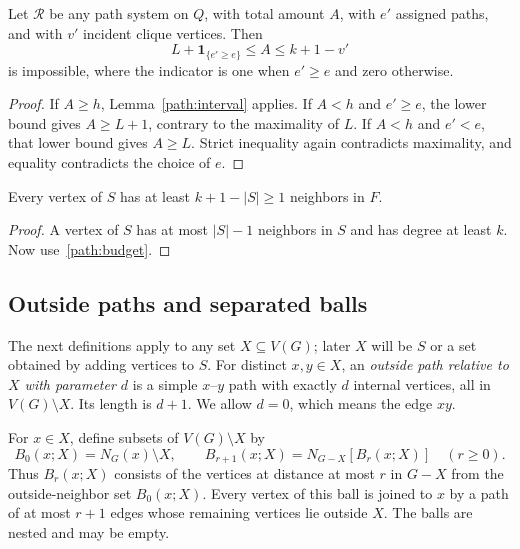 \begin{lemma}\label{path:optimality}
Let $\mathcal R$ be any path system on $Q$, with total amount $A$, with
$e'$ assigned paths, and with $v'$ incident clique vertices. Then
\begin{equation}\label{path:optimality-interval}
 L+\mathbf 1_{\{e'\geq e\}}\leq A\leq k+1-v'
\end{equation}
is impossible, where the indicator is one when $e'\geq e$ and zero
otherwise.
\end{lemma}

\begin{proof}
If $A\geq h$, Lemma~\ref{path:interval} applies. If $A<h$ and $e'\geq e$,
the lower bound gives $A\geq L+1$, contrary to the maximality of $L$.
If $A<h$ and $e'<e$, that lower bound gives $A\geq L$. Strict inequality
again contradicts maximality, and equality contradicts the choice of $e$.
\end{proof}

\begin{lemma}\label{path:exterior}
Every vertex of $S$ has at least $k+1-|S|\geq1$ neighbors in $F$.
\end{lemma}

\begin{proof}
A vertex of $S$ has at most $|S|-1$ neighbors in $S$ and has degree at
least $k$. Now use~\eqref{path:budget}.
\end{proof}

\subsection{Outside paths and separated balls}

The next definitions apply to any set $X\subseteq V(G)$; later $X$ will
be $S$ or a set obtained by adding vertices to $S$. For distinct
$x,y\in X$, an \emph{outside path relative to $X$ with parameter $d$}
is a simple $x$--$y$ path with exactly $d$ internal vertices, all in
$V(G)\setminus X$. Its length is $d+1$. We allow $d=0$, which means
the edge $xy$.

For $x\in X$, define subsets of $V(G)\setminus X$ by
\begin{equation}\label{path:balls}
 B_0(x;X)=N_G(x)\setminus X,
 \qquad
 B_{r+1}(x;X)=N_{G-X}[B_r(x;X)]\quad(r\geq0).
\end{equation}
Thus $B_r(x;X)$ consists of the vertices at distance at most $r$ in
$G-X$ from the outside-neighbor set $B_0(x;X)$. Every vertex of this
ball is joined to $x$ by a path of at most $r+1$ edges whose remaining
vertices lie outside $X$. The balls are nested and may be empty.

